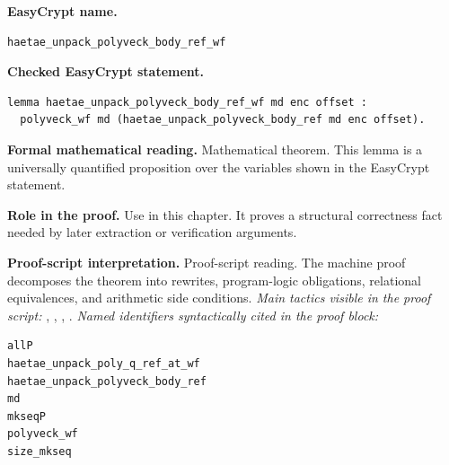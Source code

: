 \begin{formaltheorem}
\noindent\textbf{EasyCrypt name.}
\begin{lstlisting}[language=EasyCrypt,basicstyle=\ttfamily\scriptsize]
haetae_unpack_polyveck_body_ref_wf
\end{lstlisting}
\noindent\textbf{Checked EasyCrypt statement.}
\begin{lstlisting}[language=EasyCrypt,basicstyle=\ttfamily\scriptsize]
lemma haetae_unpack_polyveck_body_ref_wf md enc offset :
  polyveck_wf md (haetae_unpack_polyveck_body_ref md enc offset).
\end{lstlisting}
\noindent\textbf{Formal mathematical reading.}
Mathematical theorem. This lemma is a universally quantified proposition over the variables shown in the EasyCrypt statement.

\noindent\textbf{Role in the proof.}
Use in this chapter. It proves a structural correctness fact needed by later extraction or verification arguments.

\noindent\textbf{Proof-script interpretation.}
Proof-script reading. The machine proof decomposes the theorem into rewrites, program-logic obligations, relational equivalences, and arithmetic side conditions.
\emph{Main tactics visible in the proof script:} , , , .
\emph{Named identifiers syntactically cited in the proof block:}
\begin{lstlisting}[language=EasyCrypt,basicstyle=\ttfamily\scriptsize]
allP
haetae_unpack_poly_q_ref_at_wf
haetae_unpack_polyveck_body_ref
md
mkseqP
polyveck_wf
size_mkseq
\end{lstlisting}

\end{formaltheorem}

